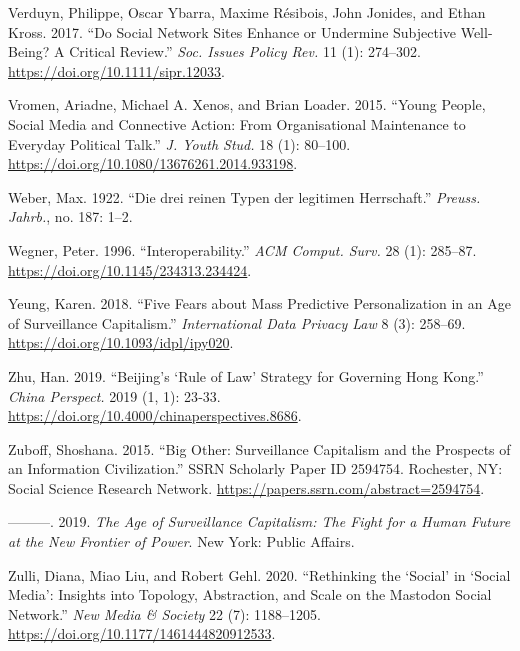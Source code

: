 \documentclass[
  a4paper,
]{book}
\newlength{\cslhangindent}
\newlength{\cslentryspacingunit} %
\newenvironment{CSLReferences}[2] %
 {%
  \setlength{\parindent}{0pt}
  \ifodd #1
  \let\oldpar\par
  \def\par{\hangindent=\cslhangindent\oldpar}
  \fi
  \setlength{\parskip}{#2\cslentryspacingunit}
 }%
 {}
\begin{document}
\begin{CSLReferences}{1}{0}
\hypertarget{ref-verduynSocialNetworkSites2017}{}
Verduyn, Philippe, Oscar Ybarra, Maxime Résibois, John Jonides, and Ethan Kross. 2017. {``Do {Social Network Sites Enhance} or {Undermine Subjective Well-Being}? {A Critical Review}.''} \emph{Soc. Issues Policy Rev.} 11 (1): 274--302. \url{https://doi.org/10.1111/sipr.12033}.

\hypertarget{ref-vromenYoungPeopleSocial2015}{}
Vromen, Ariadne, Michael A. Xenos, and Brian Loader. 2015. {``Young People, Social Media and Connective Action: From Organisational Maintenance to Everyday Political Talk.''} \emph{J. Youth Stud.} 18 (1): 80--100. \url{https://doi.org/10.1080/13676261.2014.933198}.

\hypertarget{ref-weberDreiReinenTypen1922}{}
Weber, Max. 1922. {``Die drei reinen Typen der legitimen Herrschaft.''} \emph{Preuss. Jahrb.}, no. 187: 1--2.

\hypertarget{ref-wegnerInteroperability1996}{}
Wegner, Peter. 1996. {``Interoperability.''} \emph{ACM Comput. Surv.} 28 (1): 285--87. \url{https://doi.org/10.1145/234313.234424}.

\hypertarget{ref-yeungFiveFearsMass2018}{}
Yeung, Karen. 2018. {``Five Fears about Mass Predictive Personalization in an Age of Surveillance Capitalism.''} \emph{International Data Privacy Law} 8 (3): 258--69. \url{https://doi.org/10.1093/idpl/ipy020}.

\hypertarget{ref-zhuBeijingRuleLaw2019}{}
Zhu, Han. 2019. {``Beijing's {`{Rule} of {Law}'} {Strategy} for {Governing Hong Kong}.''} \emph{China Perspect.} 2019 (1, 1): 23‑33. \url{https://doi.org/10.4000/chinaperspectives.8686}.

\hypertarget{ref-zuboffBigOtherSurveillance2015}{}
Zuboff, Shoshana. 2015. {``Big {Other}: {Surveillance Capitalism} and the {Prospects} of an {Information Civilization}.''} SSRN Scholarly Paper ID 2594754. {Rochester, NY}: {Social Science Research Network}. \url{https://papers.ssrn.com/abstract=2594754}.

\hypertarget{ref-zuboffAgeSurveillanceCapitalism2019}{}
---------. 2019. \emph{The Age of Surveillance Capitalism: The Fight for a Human Future at the New Frontier of Power}. {New York}: {Public Affairs}.

\hypertarget{ref-zulliRethinkingSocialSocial2020}{}
Zulli, Diana, Miao Liu, and Robert Gehl. 2020. {``Rethinking the {`Social'} in {`Social Media'}: {Insights} into Topology, Abstraction, and Scale on the {Mastodon} Social Network.''} \emph{New Media \& Society} 22 (7): 1188--1205. \url{https://doi.org/10.1177/1461444820912533}.

\end{CSLReferences}

\backmatter
\end{document}

